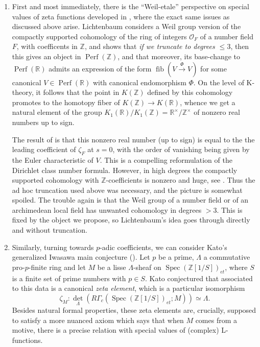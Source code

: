 \documentclass[12pt]{article}
\theoremstyle{definition}
\newcommand{\on}{\operatorname}
\newcommand{\mbb}{\mathbb}
\begin{document}
\begin{enumerate}
\item First and most immediately, there is the ``Weil-etale'' perspective on special values of zeta functions developed in \cite{lichtenbaum}, where the exact same issues as discussed above arise.  Lichtenbaum considers a Weil group version of the compactly supported cohomology of the ring of integers $\mathcal{O}_F$ of a number field $F$, with coefficents in $\mbb{Z}$, and shows that \emph{if we truncate to degrees $\leq 3$}, then this gives an object in $\on{Perf}(\mbb{Z})$, and that moreover, its base-change to $\on{Perf}(\mbb{R})$ admits an expression of the form $\on{fib}(V\overset{\Phi}{\rightarrow}V)$ for some canonical $V\in\on{Perf}(\mbb{R})$ with canonical endomorphism $\Phi$.  On the level of K-theory, it follows that the point in $K(\mbb{Z})$ defined by this cohomology promotes to the homotopy fiber of $K(\mbb{Z})\to K(\mbb{R})$, whence we get a natural element of the group $K_1(\mbb{R}) / K_1(\mbb{Z}) = \mbb{R}^\times/\mbb{Z}^\times$ of nonzero real numbers up to sign.

The result of \cite{lichtenbaum} is that this nonzero real number (up to sign) is equal to the the leading coefficient of $\zeta_F$ at $s=0$, with the order of vanishing being given by the Euler characteristic of $V$.  This is a compelling reformulation of the Dirichlet class number formula.  However, in high degrees the compactly supported cohomology with $\mbb{Z}$-coefficients is nonzero and huge, see \cite{flach}.  Thus the ad hoc truncation used above was necessary, and the picture is somewhat spoiled.  The trouble again is that the Weil group of a number field or of an archimedean local field has unwanted cohomology in degrees $>3$.  This is fixed by the object we propose, so Lichtenbaum's idea goes through directly and without truncation.

\item Similarly, turning towards $p$-adic coefficients, we can consider Kato's generalized Iwasawa main conjecture (\cite{kato}).  Let $p$ be a prime, $\Lambda$ a commutative pro-$p$-finite ring and let $M$ be a lisse $\Lambda$-sheaf on $\on{Spec}(\mbb{Z}[1/S])_{et}$, where $S$ is a finite set of prime numbers with $p\in S$.  Kato conjectured that associated to this data is a canonical \emph{zeta element}, which is a particular isomorphism
$$\zeta_M: \on{det}_{\Lambda}(R\Gamma_c(\on{Spec}(\mbb{Z}[1/S])_{et};M))\simeq \Lambda.$$
Besides natural formal properties, these zeta elements are, crucially, supposed to satisfy a more nuanced axiom which says that when $M$ comes from a motive, there is a precise relation with special values of (complex) L-functions.


\end{enumerate}
\end{document}
